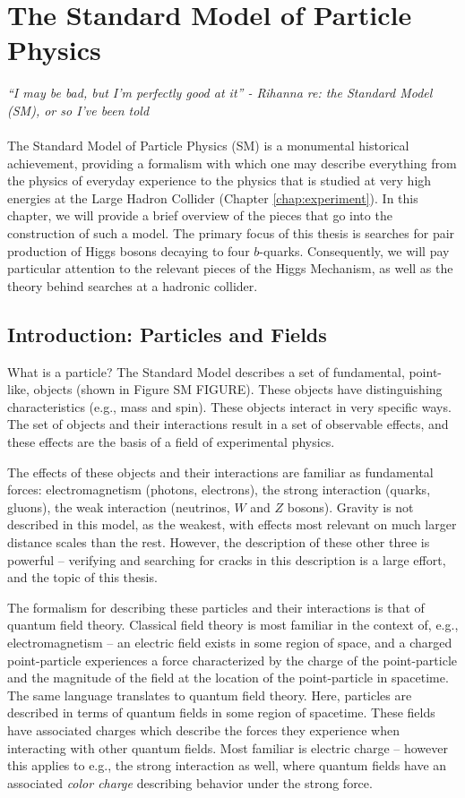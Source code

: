 \chapter{The Standard Model of Particle Physics}
\label{chap:intro-SM}
\emph{``I may be bad, but I'm perfectly good at it'' - Rihanna re: the Standard Model (SM), or so I've been told}\\\\

The Standard Model of Particle Physics (SM) is a monumental historical achievement, providing a 
formalism with which one may describe everything from the physics of everyday experience to the 
physics that is studied at very high energies at the Large Hadron Collider (Chapter \ref{chap:experiment}). 
In this chapter, we will provide a brief overview of the pieces that go into the 
construction of such a model. The primary focus of this thesis is searches for pair production of 
Higgs bosons decaying to four $b$-quarks. Consequently, we will pay particular attention to the 
relevant pieces of the Higgs Mechanism, as well as the theory behind searches at a hadronic collider.

\section{Introduction: Particles and Fields}
What is a particle? The Standard Model describes a set of fundamental, point-like, objects (shown in Figure SM FIGURE). 
These objects have distinguishing characteristics (e.g., mass and spin). These objects interact in very specific 
ways. The set of objects and their interactions result in a set of observable effects, and these effects are the basis of a field of experimental physics. 

The effects of these objects and their interactions are familiar as fundamental forces: electromagnetism (photons, 
electrons), the strong interaction (quarks, gluons), the weak interaction (neutrinos, $W$ and $Z$ bosons). Gravity is not 
described in this model, as the weakest, with effects most relevant on much larger distance scales than the rest. However, 
the description of these other three is powerful -- verifying and searching for cracks in this description is a large 
effort, and the topic of this thesis.

The formalism for describing these particles and their interactions is that of quantum field theory. Classical field theory is most familiar in the context of, e.g., electromagnetism -- an electric field exists in some region of space, and a charged point-particle experiences a force characterized by the charge of the point-particle and the magnitude of the field at the location of the point-particle in spacetime. The same language translates to quantum field theory. Here, particles are described in terms of quantum fields in some region of spacetime. These fields have associated charges which describe the forces they experience when interacting with other quantum fields. Most familiar is electric charge -- however this applies to e.g., the strong interaction as well, where quantum fields have an associated \emph{color charge} describing behavior under the strong force.

